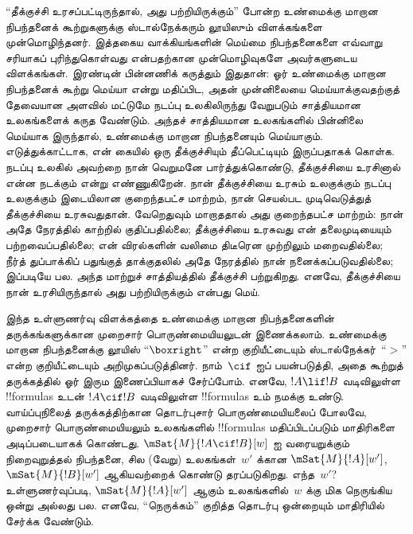 \documentclass[../../../include/open-logic-section]{subfiles}
\begin{document}


``தீக்குச்சி உரசப்பட்டிருந்தால், அது பற்றியிருக்கும்'' போன்ற உண்மைக்கு
மாறான நிபந்தனைக் கூற்றுகளுக்கு ஸ்டால்நேக்கரும் லூயிஸும் விளக்கங்களை
முன்மொழிந்தனர். இத்தகைய வாக்கியங்களின் மெய்மை நிபந்தனைகளை எவ்வாறு சரியாகப்
புரிந்துகொள்வது என்பதற்கான முன்மொழிவுகளே அவர்களுடைய விளக்கங்கள். இரண்டின்
பின்னணிக் கருத்தும் இதுதான்: ஓர் உண்மைக்கு மாறான நிபந்தனைக் கூற்று
மெய்யா என்று மதிப்பிட, அதன் முன்னிலையை மெய்யாக்குவதற்குத் தேவையான அளவில்
மட்டுமே நடப்பு உலகிலிருந்து வேறுபடும் சாத்தியமான உலகங்களைக் கருத வேண்டும்.
அந்தச் சாத்தியமான உலகங்களில் பின்னிலை மெய்யாக இருந்தால், உண்மைக்கு மாறான
நிபந்தனையும் மெய்யாகும். எடுத்துக்காட்டாக, என் கையில் ஒரு தீக்குச்சியும்
தீப்பெட்டியும் இருப்பதாகக் கொள்க. நடப்பு உலகில் அவற்றை நான் வெறுமனே
பார்த்துக்கொண்டு, தீக்குச்சியை உரசினால் என்ன நடக்கும் என்று எண்ணுகிறேன்.
நான் தீக்குச்சியை உரசும் உலகுக்கும் நடப்பு உலகுக்கும் இடையிலான குறைந்தபட்ச
மாற்றம், நான் செயல்பட முடிவெடுத்துத் தீக்குச்சியை உரசுவதுதான். வேறெதுவும்
மாறாததால் அது குறைந்தபட்ச மாற்றம்: நான் அதே நேரத்தில் காற்றில்
குதிப்பதில்லை; தீக்குச்சியை உரசுவது என் தலைமுடியையும் பற்றவைப்பதில்லை;
என் விரல்களின் வலிமை திடீரென முற்றிலும் மறைவதில்லை; நீர்த் துப்பாக்கிப்
பதுங்குத் தாக்குதலில் அதே நேரத்தில் நான் நனைக்கப்படுவதில்லை; இப்படியே
பல. அந்த மாற்றுச் சாத்தியத்தில் தீக்குச்சி பற்றுகிறது. எனவே,
தீக்குச்சியை நான் உரசியிருந்தால் அது பற்றியிருக்கும் என்பது மெய்.

இந்த உள்ளுணர்வு விளக்கத்தை உண்மைக்கு மாறான நிபந்தனைகளின் தருக்கங்களுக்கான
முறைசார் பொருண்மையியலுடன் இணைக்கலாம். உண்மைக்கு மாறான நிபந்தனைக்கு லூயிஸ்
``$\boxright$'' என்ற குறியீட்டையும் ஸ்டால்நேக்கர்~``$>$'' என்ற
குறியீட்டையும் அறிமுகப்படுத்தினர். நாம்~$\cif$ ஐப் பயன்படுத்தி, அதை
கூற்றுத் தருக்கத்தில் ஓர் இரும இணைப்பியாகச் சேர்ப்போம். எனவே, $!A \lif
!B$ வடிவிலுள்ள !!{formula}s உடன் $!A \cif !B$ வடிவிலுள்ள !!{formula}s
உம் நமக்கு உண்டு. வாய்ப்புநிலைத் தருக்கத்திற்கான தொடர்புசார்
பொருண்மையியலைப் போலவே, முறைசார் பொருண்மையியலும் உலகங்களில் !!{formula}s
மதிப்பிடப்படும் மாதிரிகளை அடிப்படையாகக் கொண்டது. $\mSat{M}{!A \cif
!B}[w]$ ஐ வரையறுக்கும் நிறைவுறுத்தல் நிபந்தனை, சில (வேறு)
உலகங்கள்~$w'$ க்கான $\mSat{M}{!A}[w']$, $\mSat{M}{!B}[w']$ ஆகியவற்றைக்
கொண்டு தரப்படுகிறது. எந்த~$w'$? உள்ளுணர்வுப்படி, $\mSat{M}{!A}[w']$
ஆகும் உலகங்களில்~$w$ க்கு மிக நெருங்கிய ஒன்று அல்லது பல. எனவே,
``நெருக்கம்'' குறித்த தொடர்பு ஒன்றையும் மாதிரியில் சேர்க்க வேண்டும்.
\end{document}

